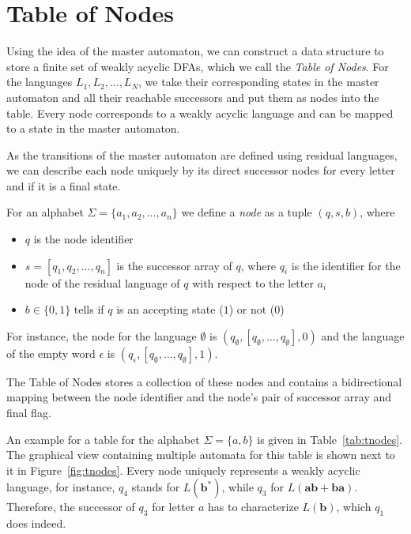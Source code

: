 \section{Table of Nodes}
Using the idea of the master automaton, we can construct a data structure to store a finite set of weakly acyclic DFAs, which we call the \textit{Table of Nodes}. For the languages $L_{1},L_{2},\dots,L_{N}$, we take their corresponding states in the master automaton and all their reachable successors and put them as nodes into the table. Every node corresponds to a weakly acyclic language and can be mapped to a state in the master automaton.
\par 
As the transitions of the master automaton are defined using residual languages, we can describe each node uniquely by its direct successor nodes for every letter and if it is a final state.
\par
For an alphabet $\Sigma = \{a_{1}, a_{2},\dots,a_{n} \}$ we define a \textit{node} as a tuple $(q,s,b)$, where
\begin{itemize}[--,noitemsep]
\item $q$ is the node identifier 
\item $s = [q_{1},q_{2},\dots,q_{n}]$ is the successor array of $q$, where $q_{i}$ is the identifier for the node of the residual language of $q$ with respect to the letter $a_{i}$
\item $b \in \{0,1\}$ tells if $q$ is an accepting state ($1$) or not ($0$)
\end{itemize}
For instance, the node for the language $\emptyset$ is $(q_{\emptyset},[q_{\emptyset},\dots,q_{\emptyset}],0)$ and the language of the empty word $\epsilon$ is $(q_{\epsilon},[q_{\emptyset},\dots,q_{\emptyset}],1)$.
\par
The Table of Nodes stores a collection of these nodes and contains a bidirectional mapping between the node identifier and the node's pair of successor array and final flag.
\par
An example for a table for the alphabet $\Sigma = \{a,b\}$ is given in Table~\ref{tab:tnodes}. The graphical view containing multiple automata for this table is shown next to it in Figure~\ref{fig:tnodes}. Every node uniquely represents a weakly acyclic language, for instance, $q_{4}$ stands for $L(\bm{b^{*}})$, while $q_{3}$ for $L(\bm{ab+ba})$. Therefore, the successor of $q_{3}$ for letter $a$ has to characterize $L(\bm{b})$, which $q_{1}$ does indeed.

